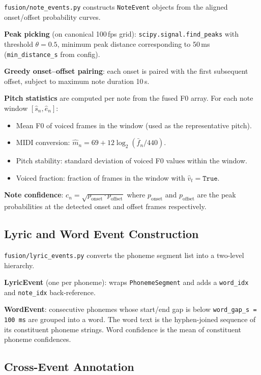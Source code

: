 \documentclass[11pt,letterpaper]{article}
\newcommand{\vh}{\hat{v}}
\newcommand{\sh}{\hat{s}}
\newcommand{\eh}{\hat{e}}
\begin{document}
\texttt{fusion/note\_events.py} constructs \texttt{NoteEvent} objects from the
aligned onset/offset probability curves.

\textbf{Peak picking} (on canonical 100\,fps grid):
\texttt{scipy.signal.find\_peaks} with threshold $\theta = 0.5$, minimum peak
distance corresponding to 50\,ms (\texttt{min\_distance\_s} from config).

\textbf{Greedy onset--offset pairing}: each onset is paired with the first
subsequent offset, subject to maximum note duration 10\,s.

\textbf{Pitch statistics} are computed per note from the fused F0 array.
For each note window $[\sh_n, \eh_n]$:
\begin{itemize}[noitemsep]
  \item Mean F0 of voiced frames in the window (used as the representative
        pitch).
  \item MIDI conversion: $\hat{m}_n = 69 + 12\log_2(\bar{f}_n/440)$.
  \item Pitch stability: standard deviation of voiced F0 values within the
        window.
  \item Voiced fraction: fraction of frames in the window with
        $\vh_t = \texttt{True}$.
\end{itemize}

\textbf{Note confidence}: $c_n = \sqrt{p_\text{onset} \cdot p_\text{offset}}$
where $p_\text{onset}$ and $p_\text{offset}$ are the peak probabilities at
the detected onset and offset frames respectively.

\subsection{Lyric and Word Event Construction}

\texttt{fusion/lyric\_events.py} converts the phoneme segment list into a
two-level hierarchy.

\textbf{LyricEvent} (one per phoneme): wraps \texttt{PhonemeSegment} and adds
a \texttt{word\_idx} and \texttt{note\_idx} back-reference.

\textbf{WordEvent}: consecutive phonemes whose start/end gap is below
\texttt{word\_gap\_s = 100\,ms} are grouped into a word.
The word text is the hyphen-joined sequence of its constituent phoneme strings.
Word confidence is the mean of constituent phoneme confidences.

\subsection{Cross-Event Annotation}
\end{document}
